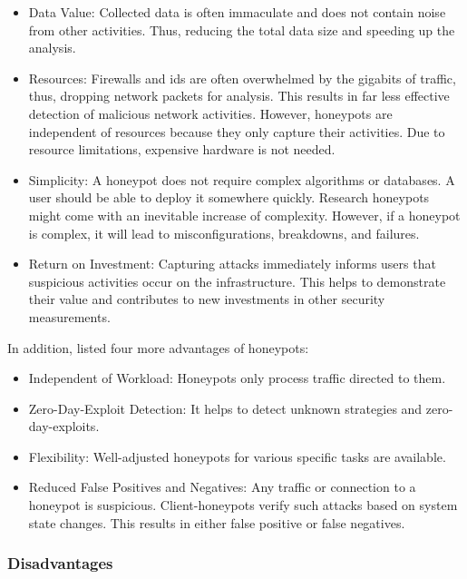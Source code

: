 \begin{itemize}
    \item Data Value: Collected data is often immaculate and does not contain noise from other activities.
          Thus, reducing the total data size and speeding up the analysis.
    \item Resources: Firewalls and \ac{ids} are often overwhelmed by the gigabits of traffic, thus, dropping network packets for analysis.
          This results in far less effective detection of malicious network activities.
          However, honeypots are independent of resources because they only capture their activities.
          Due to resource limitations, expensive hardware is not needed.
    \item Simplicity: A honeypot does not require complex algorithms or databases.
          A user should be able to deploy it somewhere quickly.
          Research honeypots might come with an inevitable increase of complexity. 
          However, if a honeypot is complex, it will lead to misconfigurations, breakdowns, and failures.
    \item Return on Investment: Capturing attacks immediately informs users that suspicious activities occur on the infrastructure.
          This helps to demonstrate their value and contributes to new investments in other security measurements.
\end{itemize}

In addition, \citet{NawrockiWSKS2016} listed four more advantages of honeypots:

\begin{itemize}
    \item Independent of Workload: Honeypots only process traffic directed to them.
    \item Zero-Day-Exploit Detection: It helps to detect unknown strategies and zero-day-exploits.
    \item Flexibility: Well-adjusted honeypots for various specific tasks are available.
    \item Reduced False Positives and Negatives: Any traffic or connection to a honeypot is suspicious.
          Client-honeypots verify such attacks based on system state changes.
          This results in either false positive or false negatives.
\end{itemize}

\subsubsection{Disadvantages}

